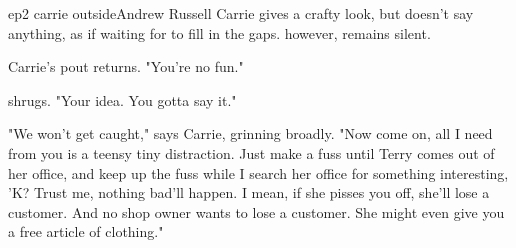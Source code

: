 \documentclass{book}
\begin{document}
\begin{childnode}{ep2 carrie outside}{Andrew Russell}
    Carrie gives \name{} a crafty look, but doesn't say anything, as if waiting for \name{} to fill in the gaps. \name{} however, remains silent. 

    Carrie's pout returns. "You're no fun."

    \name{} shrugs. "Your idea. You gotta say it."

    "We won't get caught," says Carrie, grinning broadly. "Now come on, all I need from you is a teensy tiny distraction. Just make a fuss until Terry comes out of her office, and keep up the fuss 
    while I search her office for something interesting, 'K? Trust me, nothing bad'll happen. I mean, if she pisses you off, she'll lose a customer. And no shop owner wants to lose a customer. She
    might even give you a free article of clothing."




\end{childnode}
\end{document}

